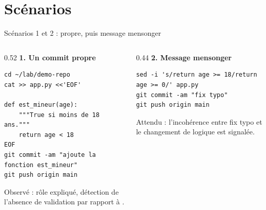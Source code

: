 \documentclass[aspectratio=169,10pt,t]{beamer}
\begin{document}
\section{Sc\'enarios}
\begin{frame}[fragile]{Sc\'enarios 1 et 2 : propre, puis message mensonger}
\begin{columns}[T]\begin{column}{0.52\textwidth}
\textbf{1. Un commit propre}
\begin{lstlisting}[style=term]
cd ~/lab/demo-repo
cat >> app.py <<'EOF'

def est_mineur(age):
    """True si moins de 18 ans."""
    return age < 18
EOF
git commit -am "ajoute la fonction est_mineur"
git push origin main
\end{lstlisting}
Observ\'e : r\^ole expliqu\'e, d\'etection de l'absence de validation par rapport \`a .
\end{column}\begin{column}{0.44\textwidth}
\textbf{2. Message mensonger}
\begin{lstlisting}[style=term]
sed -i 's/return age >= 18/return age >= 0/' app.py
git commit -am "fix typo"
git push origin main
\end{lstlisting}
Attendu : l'incoh\'erence entre \og fix typo \fg{} et le changement de logique est signal\'ee.
\end{column}\end{columns}
\end{frame}
\end{document}
